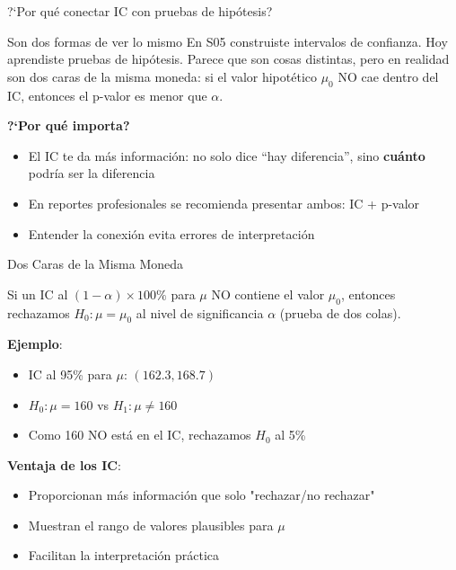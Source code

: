 \documentclass[aspectratio=169, 11pt]{beamer}
\begin{document}
\begin{frame}{?`Por qu\'e conectar IC con pruebas de hip\'otesis?}
\small
\begin{exampleblock}{Son dos formas de ver lo mismo}
En S05 construiste intervalos de confianza. Hoy aprendiste pruebas de hip\'otesis. Parece que son cosas distintas, pero en realidad son \alert{dos caras de la misma moneda}: si el valor hipot\'etico $\mu_0$ NO cae dentro del IC, entonces el p-valor es menor que $\alpha$.
\end{exampleblock}

\vspace{0.2cm}
\textbf{?`Por qu\'e importa?}
\begin{itemize}\setlength{\itemsep}{1pt}
  \item El IC te da m\'as informaci\'on: no solo dice ``hay diferencia'', sino \textbf{cu\'anto} podr\'ia ser la diferencia
  \item En reportes profesionales se recomienda presentar \alert{ambos}: IC + p-valor
  \item Entender la conexi\'on evita errores de interpretaci\'on
\end{itemize}
\end{frame}

\begin{frame}{Dos Caras de la Misma Moneda}
\begin{theorem}
Si un IC al $(1-\alpha) \times 100\%$ para $\mu$ \alert{NO contiene} el valor $\mu_0$, entonces rechazamos $H_0: \mu = \mu_0$ al nivel de significancia $\alpha$ (prueba de dos colas).
\end{theorem}

\vspace{0.3cm}
\textbf{Ejemplo}:
\begin{itemize}
  \item IC al 95\% para $\mu$: $(162.3, 168.7)$
  \item $H_0: \mu = 160$ vs $H_1: \mu \neq 160$
  \item Como 160 NO está en el IC, rechazamos $H_0$ al 5\%
\end{itemize}

\vspace{0.3cm}
\textbf{Ventaja de los IC}:
\begin{itemize}
  \item Proporcionan más información que solo "rechazar/no rechazar"
  \item Muestran el rango de valores plausibles para $\mu$
  \item Facilitan la interpretación práctica
\end{itemize}
\end{frame}
\end{document}
